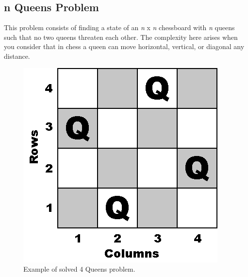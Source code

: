 \documentclass[10pt,twoside]{IEEEtran}
\begin{document}
\subsection{n Queens Problem}
This problem consists of finding a state of an \emph{n} x \emph{n} chessboard with \emph{n} queens such that no two queens threaten each other. The complexity here arises when you consider that in chess a queen can move horizontal, vertical, or diagonal any distance.

\begin{figure}[h]
	\centering
	\includegraphics[width=0.7\linewidth]{../diagrams/nqueens.png}
	\caption{Example of solved 4 Queens problem.}
	\label{Nqueen fig}
\end{figure}


\end{document}
